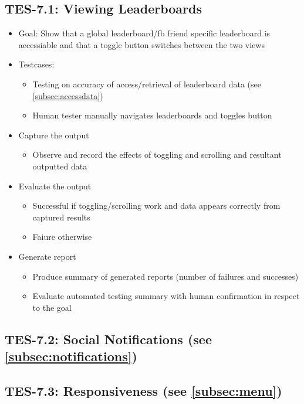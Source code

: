 \subsection{TES-7.1: Viewing Leaderboards}
\label{subsec:viewleader}
\begin{itemize}
\item Goal: Show that a global leaderboard/fb friend specific leaderboard is accessiable and that a toggle button switches between the two views

\item Testcases: 
\begin{itemize}
\item Testing on accuracy of access/retrieval of leaderboard data (see \ref{subsec:accessdata})
\item Human tester manually navigates leaderboards and toggles button
\end{itemize}

\item Capture the output 
\begin{itemize}
\item Observe and record the effects of toggling and scrolling and resultant outputted data
\end{itemize}

\item Evaluate the output 
\begin{itemize}
\item Successful if toggling/scrolling work and data appears correctly from captured results
\item Faiure otherwise
\end{itemize}

\item Generate report
\begin{itemize}
\item Produce summary of generated reports (number of failures and successes)
\item Evaluate automated testing summary with human confirmation in respect to the goal
\end{itemize}
\end{itemize}

\subsection{TES-7.2: Social Notifications (see \ref{subsec:notifications})}

\subsection{TES-7.3: Responsiveness (see \ref{subsec:menu})}

